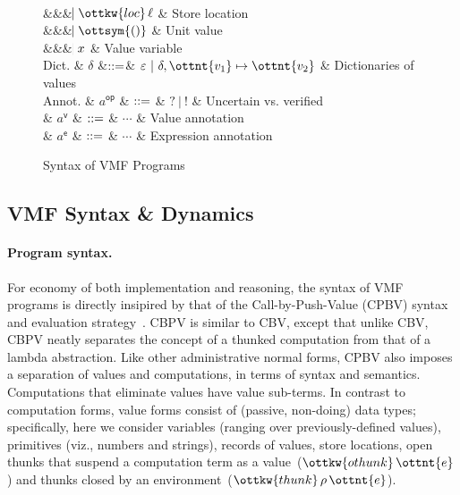 \begin{figure}
\begin{grammar}
  \\ &&& $\bnfaltbrk \ottkw{loc} \, \ell$ & Store location
  \\ &&& $\bnfaltbrk \ottsym{()}$    & Unit value
  \\ &&& $\hspace{-1.02ex}\mathrel{\mid} x$     & Value variable
  \\
  Dict. & $\delta$
  &$\mathrel{::=}$& $\varepsilon~|~ \delta  ,  \ottnt{v_{{\mathrm{1}}}}  \mapsto  \ottnt{v_{{\mathrm{2}}}} $ & Dictionaries of values
  \\[2mm]
  Annot.
    & $a^{\textsf{op} }$ & $\mathrel{::=}$ & $ \texttt{?} ~|~ \texttt{!} $ & Uncertain vs. verified
  \\
    & $a^\textsf{v}$ & $\mathrel{::=}$ & $\cdots$ & Value annotation
  \\
    & $a^\textsf{e}$ & $\mathrel{::=}$ & $\cdots$ & Expression annotation

\end{grammar}
\caption{Syntax of VMF Programs}
\label{fig-syntax}
\end{figure}

\subsection{VMF Syntax \& Dynamics}

\paragraph{Program syntax.}
For economy of both implementation and reasoning, the syntax of VMF
programs is directly insipired by that of the Call-by-Push-Value
(CPBV) syntax and evaluation strategy~\cite{CBPV}.
%
CBPV is similar to CBV, except that unlike CBV, CBPV neatly separates
the concept of a thunked computation from that of a lambda
abstraction.
%
Like other administrative normal forms, CPBV also imposes a separation
of values and computations, in terms of syntax and semantics.
%
Computations that eliminate values have value sub-terms.
%
In contrast to computation forms, value forms consist of (passive,
non-doing) data types; specifically, here we consider variables
(ranging over previously-defined values), primitives (viz., numbers
and strings), records of values, store locations, open thunks that
suspend a computation term as a value~($\ottkw{othunk} \, \ottnt{e}$) and thunks
closed by an environment~($\ottkw{thunk} \, \rho \, \ottnt{e}$).

